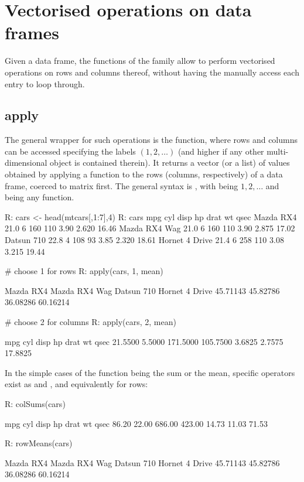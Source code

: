 \section{Vectorised operations on data frames}\label{sec: apply}
Given a data frame, the functions of the family
 allow to perform vectorised operations
on rows and columns thereof, without having the manually
access each entry to loop through.

\subsection{apply}
The general wrapper for such operations is the
 function, where rows and columns can 
be accessed specifying the labels $(1,2,\ldots)$ (and higher 
if any other multi-dimensional object is contained 
therein). It returns a vector (or a list) of 
values obtained by applying a function to the 
rows (columns, respectively) of a data frame, coerced
to matrix first. The general syntax is 
, with  being
$1,2,\ldots$ and  being any function.
\begin{example}
R: cars <- head(mtcars[,1:7],4)
R: cars
                   mpg cyl disp  hp drat    wt  qsec
Mazda RX4         21.0   6  160 110 3.90 2.620 16.46
Mazda RX4 Wag     21.0   6  160 110 3.90 2.875 17.02
Datsun 710        22.8   4  108  93 3.85 2.320 18.61
Hornet 4 Drive    21.4   6  258 110 3.08 3.215 19.44

# choose 1 for rows
R: apply(cars, 1, mean)

Mazda RX4  Mazda RX4 Wag     Datsun 710 Hornet 4 Drive 
45.71143       45.82786       36.08286       60.16214 
      
# choose 2 for columns
R: apply(cars, 2, mean)  

    mpg      cyl     disp       hp     drat       wt     qsec 
21.5500   5.5000 171.5000 105.7500   3.6825   2.7575  17.8825
\end{example}
In the simple cases of the function being the sum or the mean,
specific operators exist as  and ,
and equivalently for rows:
\begin{example}
R: colSums(cars)

   mpg    cyl   disp     hp   drat     wt   qsec 
 86.20  22.00 686.00 423.00  14.73  11.03  71.53
 
R: rowMeans(cars)

Mazda RX4  Mazda RX4 Wag     Datsun 710 Hornet 4 Drive 
45.71143       45.82786       36.08286       60.16214 
\end{example}

